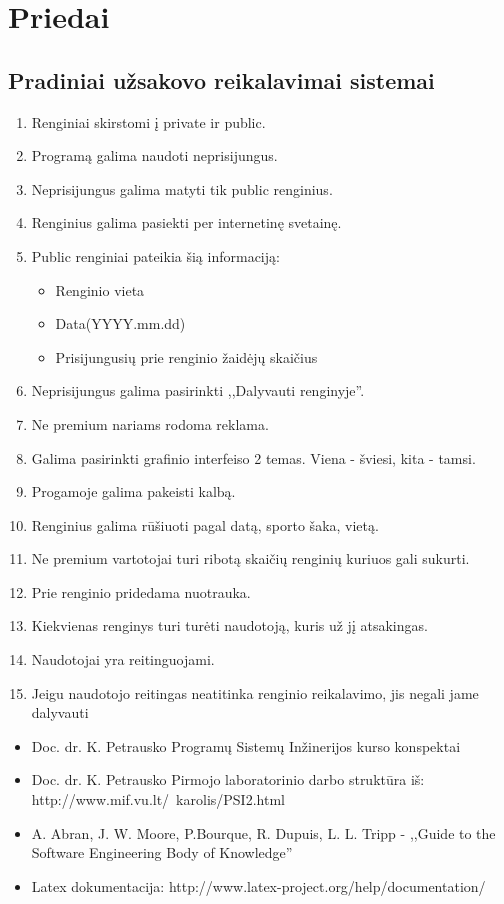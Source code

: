 \documentclass{VUMIFPSkursinis}
\begin{document}
    \section{Priedai}\label{priedai}
        \subsection{Pradiniai užsakovo reikalavimai sistemai} \label{priedai_uzsakovoReikalavimai}
		\begin{enumerate}
				\item Renginiai skirstomi į private ir public.
				\item Programą galima naudoti neprisijungus.
				\item Neprisijungus galima matyti tik public renginius.
				\item Renginius galima pasiekti per internetinę svetainę.
				\item Public renginiai pateikia šią informaciją:
				\begin{itemize}
					\item Renginio vieta
					\item Data(YYYY.mm.dd)
					\item Prisijungusių prie renginio žaidėjų skaičius
				\end{itemize}
				\item Neprisijungus galima pasirinkti ,,Dalyvauti renginyje''.
				\item Ne premium nariams rodoma reklama.
				\item Galima pasirinkti grafinio interfeiso 2 temas. Viena - šviesi, kita - tamsi.
				\item Progamoje galima pakeisti kalbą.
				\item Renginius galima rūšiuoti pagal datą, sporto šaka, vietą.
				\item Ne premium vartotojai turi ribotą skaičių renginių kuriuos gali sukurti.
				\item Prie renginio pridedama nuotrauka.
				\item Kiekvienas renginys turi turėti naudotoją, kuris už jį atsakingas.
				\item Naudotojai yra reitinguojami.
				\item Jeigu naudotojo reitingas neatitinka renginio reikalavimo, jis negali jame dalyvauti
		\end{enumerate}
		

     \label{literaturosSarasas}
        \begin{itemize}
			\item Doc. dr. K. Petrausko Programų Sistemų Inžinerijos kurso konspektai
			\item Doc. dr. K. Petrausko Pirmojo laboratorinio darbo struktūra iš: http://www.mif.vu.lt/~karolis/PSI2.html
			\item A. Abran, J. W. Moore, P.Bourque, R. Dupuis, L. L. Tripp - ,,Guide to the Software Engineering Body of Knowledge''
			\item Latex dokumentacija: http://www.latex-project.org/help/documentation/
        \end{itemize}
\end{document}
